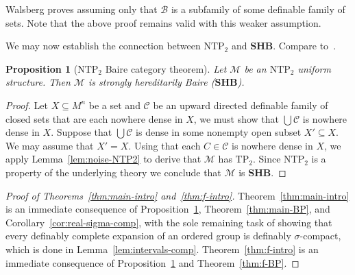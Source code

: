\documentclass[12pt]{article}
\newcommand{\Bb}{\mathcal{B}}
\newcommand{\Cc}{\mathcal{C}}
\newcommand{\Mm}{\mathcal{M}}
\newcommand{\BP}{\textbf{SHB}}
\newcommand{\BU}{\Bb} %
\newcommand{\NTP}{\ensuremath{\mathrm{NTP}_2}}
\newcommand{\TP}{\ensuremath{\mathrm{TP}_2}}
\newtheorem{proposition}[theorem]{Proposition}
\theoremstyle{definition}
\theoremstyle{remark}
\begin{document}
Walsberg proves \cite[Theorem 4.1]{Wal22} assuming only that $\BU$ is a subfamily of some definable family of sets. Note that the above proof remains valid with this weaker assumption. 



We may now establish the connection between $\NTP$ and $\BP$. Compare to~\cite[Corollary 4.2]{Wal22}.

\begin{proposition}[$\NTP$ Baire category theorem]\label{prop:BCT}
Let $\Mm$ be an \NTP{} uniform structure. Then $\Mm$ is strongly hereditarily Baire ($\BP$).
\end{proposition}
\begin{proof}
Let $X\subseteq M^n$ be a set and $\Cc$ be an upward directed definable family of closed sets that are each nowhere dense in $X$, we must show that $\bigcup \Cc$ is nowhere dense in $X$. Suppose that $\bigcup \Cc$ is dense in some nonempty open subset $X'\subseteq X$. We may assume that $X'=X$. Using that each $C\in \Cc$ is nowhere dense in $X$, we apply Lemma~\ref{lem:noise-NTP2} to derive that $\Mm$ has $\TP$. Since $\NTP$ is a property of the underlying theory we conclude that $\Mm$ is $\BP$.  
\end{proof}

\begin{proof}[Proof of Theorems~\ref{thm:main-intro} and~\ref{thm:f-intro}]
Theorem~\ref{thm:main-intro} is an immediate consequence of Proposition~\ref{prop:BCT}, Theorem~\ref{thm:main-BP}, and Corollary~\ref{cor:real-sigma-comp}, with the sole remaining task of showing that every definably complete expansion of an ordered group is definably $\sigma$-compact, which is done in Lemma~\ref{lem:intervals-comp}. Theorem~\ref{thm:f-intro} is an immediate consequence of Proposition~\ref{prop:BCT} and Theorem~\ref{thm:f-BP}.
\end{proof}
\end{document}
